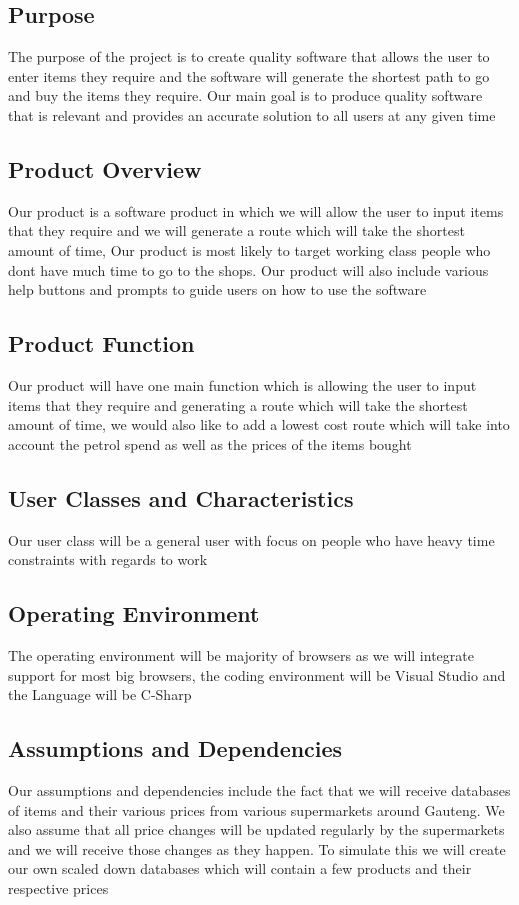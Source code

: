 \documentclass[12pt]{article}
\begin{document}
\subsection{Purpose}
The purpose of the project is to create quality software that allows 
the user to enter items they require and the software will generate the shortest
path to go and buy the items they require. Our main goal is to produce quality software
that is relevant and provides an accurate solution to all users at any given time

\subsection{Product Overview}
Our product is a software product in which we will allow the user to input 
items that they require and we will generate a route which will take the shortest amount
of time, Our product is most likely to target working class people who dont have much time 
to go to the shops. Our product will also include various help buttons and prompts to guide 
users on how to use the software 
\subsection{Product Function}
Our product will have one main function which is allowing the user to input 
items that they require and generating a route which will take the shortest amount
of time, we would also like to add a lowest cost route which will take into account 
the petrol spend as well as the prices of the items bought
\subsection{User Classes and Characteristics}
Our user class will be a general user with focus
on people who have heavy time constraints with regards to work
\subsection{Operating Environment}
The operating environment will be majority of browsers as we will 
integrate support for most big browsers, the coding environment will be Visual Studio and the
Language will be C-Sharp
\subsection{Assumptions and Dependencies}
Our assumptions and dependencies include the fact that we will
receive databases of items and their various prices from various supermarkets around Gauteng.
We also assume that all price changes will be updated regularly by the supermarkets and we will 
receive those changes as they happen. To simulate this we will create our own scaled down databases
which will contain a few products and their respective prices
\end{document}
